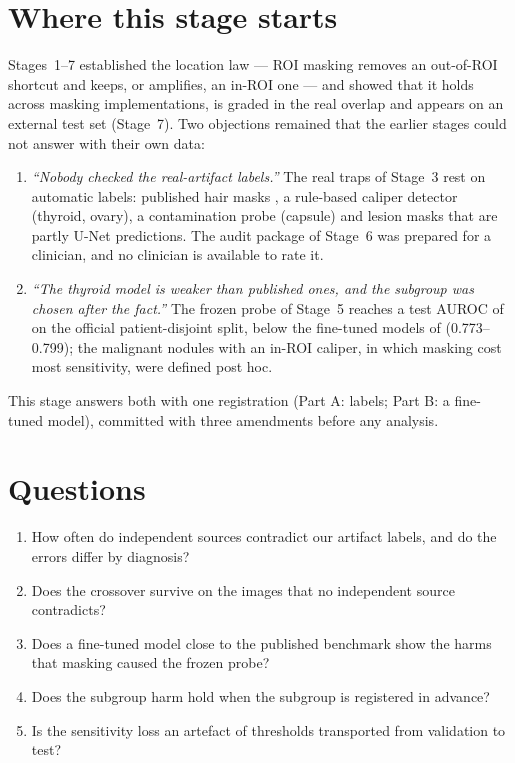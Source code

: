 \tableofcontents
\clearpage

\section{Where this stage starts}
Stages~1--7 established the location law --- ROI masking removes an out-of-ROI shortcut and keeps, or amplifies, an
in-ROI one --- and showed that it holds across masking implementations, is graded in the real overlap and appears on an
external test set (Stage~7). Two objections remained that the earlier stages could not answer with their own data:
\begin{enumerate}[leftmargin=*]\itemsep1pt
\item \emph{``Nobody checked the real-artifact labels.''} The real traps of Stage~3 rest on automatic labels: published
hair masks \citep{wegley2026artifacts}, a rule-based caliper detector (thyroid, ovary), a contamination probe (capsule)
and lesion masks that are partly U-Net predictions. The audit package of Stage~6 was prepared for a clinician, and no
clinician is available to rate it.
\item \emph{``The thyroid model is weaker than published ones, and the subgroup was chosen after the fact.''} The frozen
probe of Stage~5 reaches a test AUROC of \sEightFrozenAuc{} on the official patient-disjoint split, below the fine-tuned
models of \citet{gong2022acl} (0.773--0.799); the \sEightSubN{} malignant nodules with an in-ROI caliper, in which masking
cost most sensitivity, were defined post hoc.
\end{enumerate}
This stage answers both with one registration (Part A: labels; Part B: a fine-tuned model), committed with three
amendments before any analysis.

\section{Questions}
\begin{enumerate}[label=\textbf{Q8\alph*},leftmargin=*]\itemsep1pt
\item How often do independent sources contradict our artifact labels, and do the errors differ by diagnosis?
\item Does the crossover survive on the images that no independent source contradicts?
\item Does a fine-tuned model close to the published benchmark show the harms that masking caused the frozen probe?
\item Does the subgroup harm hold when the subgroup is registered in advance?
\item Is the sensitivity loss an artefact of thresholds transported from validation to test?
\end{enumerate}
